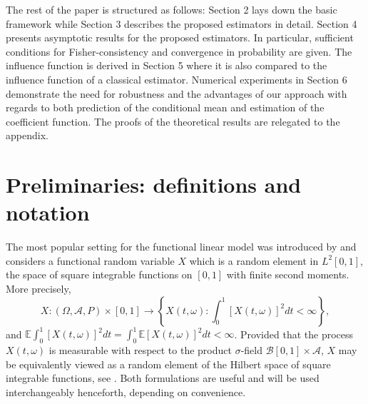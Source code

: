 \documentclass[11pt]{article}
\begin{document}
The rest of the paper is structured as follows: Section 2 lays down the basic framework while Section 3 describes the proposed estimators in detail. Section 4 presents asymptotic results for the proposed estimators. In particular, sufficient conditions for Fisher-consistency and convergence in probability are given. The influence function is derived in Section 5 where it is also compared to the influence function of a classical estimator. Numerical experiments in Section 6 demonstrate the need for robustness and the advantages of our approach with regards to both prediction of the conditional mean and estimation of the coefficient function. The proofs of the theoretical results are relegated to the appendix.

\section{Preliminaries: definitions and notation}

The most popular setting for the functional linear model was introduced by \cite{cardot1999functional} and considers a functional random variable $X$ which is a random element in $L^2[0,1]$, the space of square integrable functions on $[0,1]$ with finite second moments. More precisely,
\begin{equation}
\label{eq:2}
X:\left(\Omega, \mathcal{A}, P \right) \times [0,1]  \to \left\{ X\left(t, \omega \right): \int_{0}^{1} \left[ X(t,\omega) \right]^2 dt < \infty \right\},
\end{equation}
and $\mathbb{E} \int_0^{1} \left[ X\left(t,\omega\right) \right]^2 dt = \int_0^{1} \mathbb{E}  \left[ X\left(t,\omega\right)\right] ^2  dt < \infty$. Provided that the process $X(t,\omega)$ is measurable with respect to the product $\sigma$-field $\mathcal{B}[0,1] \times \mathcal{A}$, $X$ may be equivalently viewed as a random element of the Hilbert space of square integrable functions, see \citet[p.~190]{hsing2015theoretical}. Both formulations are useful and will be used interchangeably henceforth, depending on convenience.
\end{document}
